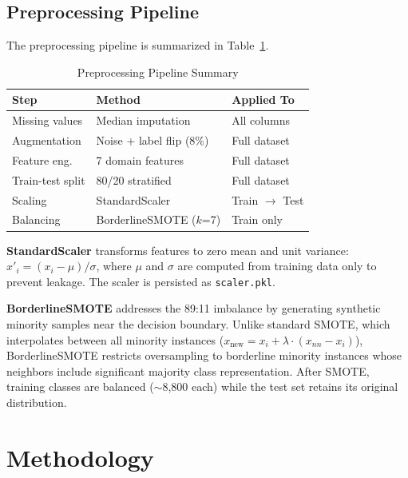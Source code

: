 \documentclass[journal]{IEEEtran}
\begin{document}
\subsection{Preprocessing Pipeline}

The preprocessing pipeline is summarized in Table~\ref{tab:pipeline_summary}.

\begin{table}[!t]
\centering
\caption{Preprocessing Pipeline Summary}
\label{tab:pipeline_summary}
\begin{tabular}{lll}
\toprule
\textbf{Step} & \textbf{Method} & \textbf{Applied To} \\
\midrule
Missing values & Median imputation & All columns \\
Augmentation & Noise + label flip (8\%) & Full dataset \\
Feature eng. & 7 domain features & Full dataset \\
Train-test split & 80/20 stratified & Full dataset \\
Scaling & StandardScaler & Train $\rightarrow$ Test \\
Balancing & BorderlineSMOTE ($k$=7) & Train only \\
\bottomrule
\end{tabular}
\end{table}

\textbf{StandardScaler} transforms features to zero mean and unit variance: $x'_i = (x_i - \mu)/\sigma$, where $\mu$ and $\sigma$ are computed from training data only to prevent leakage. The scaler is persisted as \texttt{scaler.pkl}.

\textbf{BorderlineSMOTE} addresses the 89:11 imbalance by generating synthetic minority samples near the decision boundary. Unlike standard SMOTE, which interpolates between all minority instances ($x_{\text{new}} = x_i + \lambda \cdot (x_{nn} - x_i)$), BorderlineSMOTE restricts oversampling to borderline minority instances whose neighbors include significant majority class representation. After SMOTE, training classes are balanced ($\sim$8,800 each) while the test set retains its original distribution.


\section{Methodology}
\end{document}
